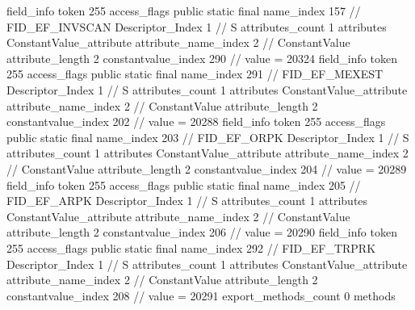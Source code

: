 {{{{{{{				}
				}
			}
			field_info {
				token	255
				access_flags	public static final
				name_index	157		// FID_EF_INVSCAN
				Descriptor_Index	1		// S
				attributes_count	1
				attributes {
				ConstantValue_attribute {
					attribute_name_index	2		// ConstantValue
					attribute_length	2
					constantvalue_index	290		// value = 20324
				}
				}
			}
			field_info {
				token	255
				access_flags	public static final
				name_index	291		// FID_EF_MEXEST
				Descriptor_Index	1		// S
				attributes_count	1
				attributes {
				ConstantValue_attribute {
					attribute_name_index	2		// ConstantValue
					attribute_length	2
					constantvalue_index	202		// value = 20288
				}
				}
			}
			field_info {
				token	255
				access_flags	public static final
				name_index	203		// FID_EF_ORPK
				Descriptor_Index	1		// S
				attributes_count	1
				attributes {
				ConstantValue_attribute {
					attribute_name_index	2		// ConstantValue
					attribute_length	2
					constantvalue_index	204		// value = 20289
				}
				}
			}
			field_info {
				token	255
				access_flags	public static final
				name_index	205		// FID_EF_ARPK
				Descriptor_Index	1		// S
				attributes_count	1
				attributes {
				ConstantValue_attribute {
					attribute_name_index	2		// ConstantValue
					attribute_length	2
					constantvalue_index	206		// value = 20290
				}
				}
			}
			field_info {
				token	255
				access_flags	public static final
				name_index	292		// FID_EF_TRPRK
				Descriptor_Index	1		// S
				attributes_count	1
				attributes {
				ConstantValue_attribute {
					attribute_name_index	2		// ConstantValue
					attribute_length	2
					constantvalue_index	208		// value = 20291
				}
				}
			}
			}
			export_methods_count	0
			methods {
			}
		}
	}
}
